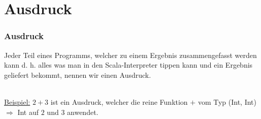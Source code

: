 	\section[Section]{Ausdruck}
		\begin{frame}
			\frametitle{Ausdruck}
			\begin{defe}[Ausdurck]
				Jeder Teil eines Programms, welcher zu einem Ergebnis 								zusammengefasst werden kann d. h. alles was man in den 
				Scala-Interpreter tippen kann und ein Ergebnis geliefert bekommt,
				nennen wir einen Ausdruck.
		\end{defe} 
		\leavevmode \\
		\underline{Beispiel:} $2+3$ ist ein Ausdruck, welcher die reine Funktion
		$+$  vom Typ (Int, Int) $\Rightarrow$ Int auf $2$ und $3$ anwendet.
		\end{frame}